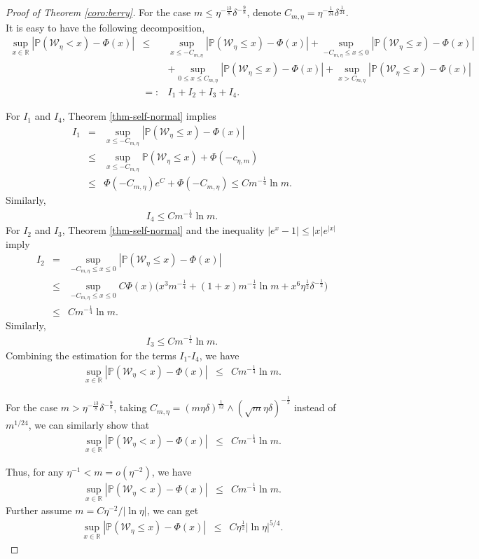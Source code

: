 \documentclass[10pt,a4paper]{amsart}
\newcommand{\PP}{\mathbb{P}}
\newcommand{\R}{\mathbb{R}}\newcommand{\RR}{\mathbb{R}}
\begin{document}
\begin{proof}[Proof of Theorem \ref{coro:berry}]
For the case $m\le\eta^{-\frac{13}8}\delta^{-\frac98}$, denote $C_{m,\eta}=\eta^{{-\frac{1}{24}}}\delta^{\frac{1}{24}} $. It is easy to have the following decomposition,	
\begin{eqnarray*}
	\sup_{x\in\R}|\PP(\mathcal{W}_\eta< x)-\Phi(x)|&\le& 	\sup_{x\le -C_{m,\eta}}|\PP(\mathcal{W}_\eta\le x)-\Phi(x)|+\sup_{-C_{m,\eta}\le x\le 0 }|\PP(\mathcal{W}_\eta\le x)-\Phi(x)|\\
	&&+\sup_{0\le x\le C_{m,\eta}}|\PP(\mathcal{W}_\eta\le x)-\Phi(x)|+\sup_{x> C_{m,\eta}}|\PP(\mathcal{W}_\eta\le x)-\Phi(x)|\\
	&=:& I_1+I_2+I_3+I_4.
\end{eqnarray*}		


For $I_1$ and $I_4$,  Theorem \ref{thm-self-normal} implies
\begin{eqnarray*}
I_1&=& \sup_{x\le -C_{m,\eta}}|\PP(\mathcal{W}_\eta\le x)-\Phi(x)|\\
&\le& \sup_{x\le -C_{m,\eta}}\PP(\mathcal{W}_\eta\le x)+\Phi(-c_{\eta,m})\\
&\le& \Phi(-C_{m,\eta})e^C+\Phi(-C_{m,\eta})\le Cm^{-\frac14}\ln m.
\end{eqnarray*}
Similarly,
\begin{eqnarray*}
I_4\le Cm^{-\frac14}\ln m.
\end{eqnarray*}
For $I_2$ and $I_3$, Theorem \ref{thm-self-normal} and the inequality $|e^x-1|\le|x|e^{|x|}$ imply
	\begin{eqnarray*}
	I_2&=&\sup_{-C_{m,\eta}\le x\le 0 }|\PP(\mathcal{W}_\eta\le x)-\Phi(x)|\\
	&\le&\sup_{-C_{m,\eta}\le x\le 0 }C\Phi(x)\big(x^3m^{-\frac14}+(1+x)m^{-\frac14}\ln m+x^6\eta^{\frac12}\delta^{-\frac12}\big)\\
	&\le& Cm^{-\frac14}\ln m.
	\end{eqnarray*}
	Similarly,
\begin{eqnarray*}
		I_3\le Cm^{-\frac14}\ln m.
\end{eqnarray*}
Combining the estimation for the terms $I_1$-$I_4$, we have
\begin{eqnarray*}
	\sup_{x\in\R}|\PP(\mathcal{W}_\eta< x)-\Phi(x)|&\le& 	Cm^{-\frac14}\ln m.
\end{eqnarray*}		

For the case $m>\eta^{-\frac{13}8}\delta^{-\frac98}$, taking $C_{m,\eta}= (m\eta\delta)^{\frac1{12}}\wedge (\sqrt m\eta\delta)^{-\frac12}$ instead of $m^{1/24}$, we can similarly show that
\begin{eqnarray*}
	\sup_{x\in\R}|\PP(\mathcal{W}_\eta< x)-\Phi(x)|&\le& Cm^{-\frac14}\ln m.
\end{eqnarray*}		

Thus, for any $\eta^{-1}<m=o(\eta^{-2})$, we have
\begin{eqnarray*}
	\sup_{x\in\R}|\PP(\mathcal{W}_\eta< x)-\Phi(x)|&\le& Cm^{-\frac14}\ln m.
\end{eqnarray*}		
Further assume $m=C\eta^{-2}/|\ln\eta|$, we can get
\begin{eqnarray*}
	\sup_{x\in\R}|\PP(\mathcal{W}_\eta\le x)-\Phi(x)|
	&\le& C\eta^{\frac12}|\ln \eta|^{5/4}.
\end{eqnarray*}	
\end{proof}	
\end{document}
